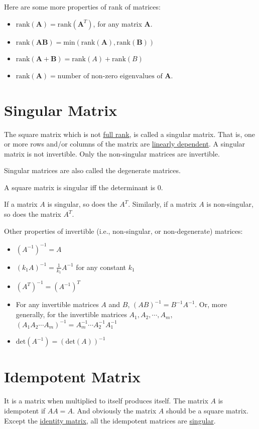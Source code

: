 \documentclass[conference,final,11pt,technote,onecolumn]{IEEEtran}\usepackage[]{graphicx}\usepackage[]{color}
\begin{document}
Here are some more properties of rank of matrices:
\begin{itemize}
	\item $\text{rank}(\mathbf{A}) = \text{rank}(\mathbf{A}^T)$, for any matrix $\mathbf{A}$.
	\item $\text{rank}(\mathbf{AB}) = \text{min}(\text{rank}(\mathbf{A}),\text{rank}(\mathbf{B}))$
	\item $\text{rank}(\mathbf{A}+\mathbf{B}) = \text{rank}(A) + \text{rank}(B)$
	\item $\text{rank}(\mathbf{A}) = \text{number of non-zero eigenvalues of }\mathbf{A}$.
\end{itemize}

	\section{Singular Matrix}
	\label{term:singular_matrix}
The square matrix which is not \hyperref[term:rank_of_a_matrix]{full rank}, is called a singular matrix. That is, one or more rows and/or columns of the matrix are \hyperref[term:linearly_independent_vectors]{linearly dependent}. A singular matrix is not invertible. Only the non-singular matrices are invertible.

Singular matrices are also called the degenerate matrices.

A square matrix is singular iff the determinant is 0.

If a matrix $A$ is singular, so does the $A^T$. Similarly, if a matrix $A$ is non-singular, so does the matrix $A^T$.

Other properties of invertible (i.e., non-singular, or non-degenerate) matrices:
\begin{itemize}
\item $(A^{-1})^{-1} = A$
\item $(k_1A)^{-1} = \frac{1}{k_1}A^{-1}$ for any constant $k_1$
\item $(A^T)^{-1} = (A^{-1})^T$
\item For any invertible matrices $A$ and $B$, $(AB)^{-1} = B^{-1}A^{-1}$. Or, more generally, for the invertible matrices $A_1, A_2, \cdots, A_m$, $(A_1A_2\cdots A_m)^{-1} = A^{-1}_m\cdots A^{-1}_2A^{-1}_1$
\item $\text{det}(A^{-1}) = (\text{det}(A))^{-1}$
\end{itemize}
	\section{Idempotent Matrix}
	\label{term:idempotent_matrix}
	It is a matrix when multiplied to itself produces itself\cite{chiang2005fundamental}. The matrix $A$ is idempotent if $AA=A$. And obviously the matrix $A$ should be a square matrix. Except the \hyperref[term:identity_matrix]{identity matrix}, all the idempotent matrices are \hyperref[term:singular_matrix]{singular}. 
	
\end{document}
